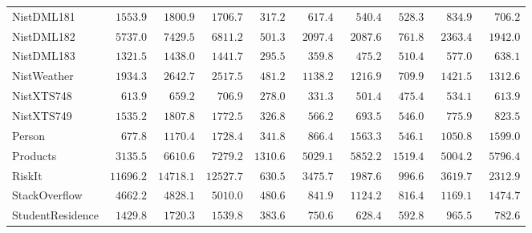 \documentclass[runningheads,a4paper]{llncs}
\begin{document}
\begin{table}
\begin{center}
{\begin{tabular}{lccc|ccc|ccc}
		NistDML181  & $\phantom{0}1553.9$ & $\phantom{0}1800.9$ & $\phantom{0}1706.7$ & $\phantom{0}317.2$ & $\phantom{00}617.4$ & $\phantom{00}540.4$ & $\phantom{0}528.3$ & $\phantom{00}834.9$ & $\phantom{00}706.2$ \\
		NistDML182  & $\phantom{0}5737.0$ & $\phantom{0}7429.5$ & $\phantom{0}6811.2$ & $\phantom{0}501.3$ & $\phantom{0}2097.4$ & $\phantom{0}2087.6$ & $\phantom{0}761.8$ & $\phantom{0}2363.4$ & $\phantom{0}1942.0$ \\
		NistDML183  & $\phantom{0}1321.5$ & $\phantom{0}1438.0$ & $\phantom{0}1441.7$ & $\phantom{0}295.5$ & $\phantom{00}359.8$ & $\phantom{00}475.2$ & $\phantom{0}510.4$ & $\phantom{00}577.0$ & $\phantom{00}638.1$ \\
		NistWeather  & $\phantom{0}1934.3$ & $\phantom{0}2642.7$ & $\phantom{0}2517.5$ & $\phantom{0}481.2$ & $\phantom{0}1138.2$ & $\phantom{0}1216.9$ & $\phantom{0}709.9$ & $\phantom{0}1421.5$ & $\phantom{0}1312.6$ \\
		NistXTS748  & $\phantom{00}613.9$ & $\phantom{00}659.2$ & $\phantom{00}706.9$ & $\phantom{0}278.0$ & $\phantom{00}331.3$ & $\phantom{00}501.4$ & $\phantom{0}475.4$ & $\phantom{00}534.1$ & $\phantom{00}613.9$ \\
		NistXTS749  & $\phantom{0}1535.2$ & $\phantom{0}1807.8$ & $\phantom{0}1772.5$ & $\phantom{0}326.8$ & $\phantom{00}566.2$ & $\phantom{00}693.5$ & $\phantom{0}546.0$ & $\phantom{00}775.9$ & $\phantom{00}823.5$ \\
		Person  & $\phantom{00}677.8$ & $\phantom{0}1170.4$ & $\phantom{0}1728.4$ & $\phantom{0}341.8$ & $\phantom{00}866.4$ & $\phantom{0}1563.3$ & $\phantom{0}546.1$ & $\phantom{0}1050.8$ & $\phantom{0}1599.0$ \\
		Products  & $\phantom{0}3135.5$ & $\phantom{0}6610.6$ & $\phantom{0}7279.2$ & $1310.6$ & $\phantom{0}5029.1$ & $\phantom{0}5852.2$ & $1519.4$ & $\phantom{0}5004.2$ & $\phantom{0}5796.4$ \\
		RiskIt  & $11696.2$ & $14718.1$ & $12527.7$ & $\phantom{0}630.5$ & $\phantom{0}3475.7$ & $\phantom{0}1987.6$ & $\phantom{0}996.6$ & $\phantom{0}3619.7$ & $\phantom{0}2312.9$ \\
		StackOverflow  & $\phantom{0}4662.2$ & $\phantom{0}4828.1$ & $\phantom{0}5010.0$ & $\phantom{0}480.6$ & $\phantom{00}841.9$ & $\phantom{0}1124.2$ & $\phantom{0}816.4$ & $\phantom{0}1169.1$ & $\phantom{0}1474.7$ \\
		StudentResidence  & $\phantom{0}1429.8$ & $\phantom{0}1720.3$ & $\phantom{0}1539.8$ & $\phantom{0}383.6$ & $\phantom{00}750.6$ & $\phantom{00}628.4$ & $\phantom{0}592.8$ & $\phantom{00}965.5$ & $\phantom{00}782.6$ \\

\end{tabular}}
\end{center}
\end{table}
\end{document}
